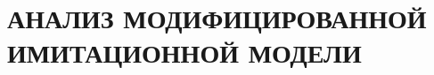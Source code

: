 \section[Анализ модифицированной имитационной модели]{АНАЛИЗ МОДИФИЦИРОВАННОЙ \\
ИМИТАЦИОННОЙ МОДЕЛИ}




\pagebreak
